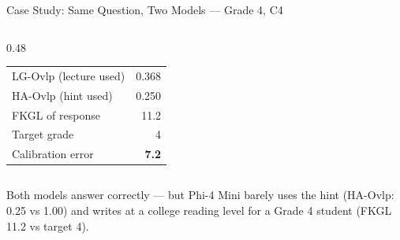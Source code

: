\documentclass[aspectratio=169]{beamer}
\begin{document}
\begin{frame}{Case Study: Same Question, Two Models --- Grade 4, C4}
\begin{columns}[T]
\begin{column}{0.48\textwidth}
\begin{tabular}{lr}
      LG-Ovlp (lecture used) & 0.368\\
      HA-Ovlp (hint used)    & \cellcolor{darkred!15}0.250\\
      FKGL of response       & 11.2\\
      Target grade           & 4\\
      Calibration error      & \cellcolor{darkred!15}\textbf{7.2}\\
    \end{tabular}
  \end{column}
\end{columns}
\vspace{0.1cm}
{\footnotesize Both models answer correctly --- but Phi-4 Mini barely uses the hint (HA-Ovlp: 0.25 vs 1.00) and writes at a college reading level for a Grade 4 student (FKGL 11.2 vs target 4).}
\end{frame}
\end{document}
